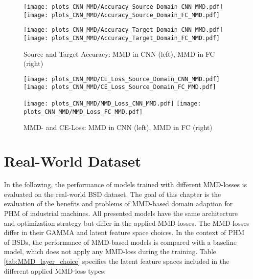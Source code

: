 \begin{figure}[htp]
  \centering
  \texttt{[image: plots\_CNN\_MMD/Accuracy\_Source\_Domain\_CNN\_MMD.pdf]}
  \hspace{.3cm}
  \texttt{[image: plots\_CNN\_MMD/Accuracy\_Source\_Domain\_FC\_MMD.pdf]}

  \vspace{.1cm}

  \texttt{[image: plots\_CNN\_MMD/Accuracy\_Target\_Domain\_CNN\_MMD.pdf]}
  \hspace{.3cm}
  \texttt{[image: plots\_CNN\_MMD/Accuracy\_Target\_Domain\_FC\_MMD.pdf]}

  \caption{Source and Target Accuracy: MMD in CNN (left), MMD in FC (right)}
  \label{fig:accuracy_cnn_and_no_cnn_mmd}
\end{figure}

\begin{figure}[H]
  \centering
  \texttt{[image: plots\_CNN\_MMD/CE\_Loss\_Source\_Domain\_CNN\_MMD.pdf]}
  \hspace{.3cm}
  \texttt{[image: plots\_CNN\_MMD/CE\_Loss\_Source\_Domain\_FC\_MMD.pdf]}

  \vspace{.1cm}

  \texttt{[image: plots\_CNN\_MMD/MMD\_Loss\_CNN\_MMD.pdf]}
  \hspace{.1cm}
  \texttt{[image: plots\_CNN\_MMD/MMD\_Loss\_FC\_MMD.pdf]}

  \caption{MMD- and CE-Loss: MMD in CNN (left), MMD in FC (right)}
  \label{fig:loss_cnn_and_no_cnn_mmd}
\end{figure}

\section{Real-World Dataset}
In the following, the performance of models trained with different MMD-losses is evaluated on the real-world BSD dataset. The goal of this chapter is the evaluation of the benefits and problems of MMD-based domain adaption for PHM of industrial machines. All presented models have the same architecture and optimization strategy but differ in the applied MMD-losses. The MMD-losses differ in their GAMMA and latent feature space choices. In the context of PHM of BSDs, the performance of MMD-based models is compared with a baseline model, which does not apply any MMD-loss during the training. Table \ref{tab:MMD_layer_choice}  specifies the latent feature spaces included in the different applied MMD-loss types:

